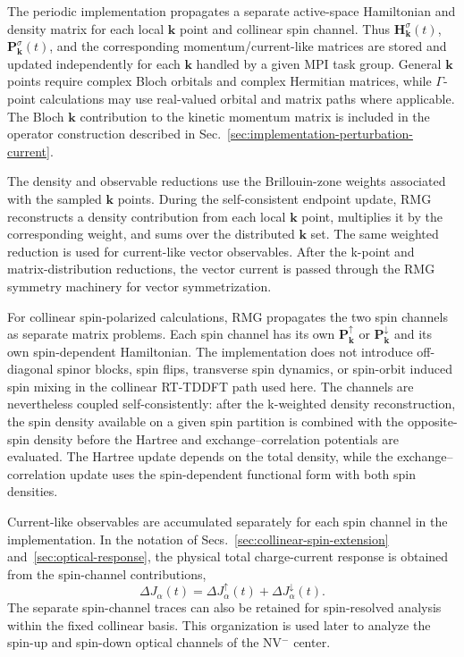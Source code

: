 The periodic implementation propagates a separate active-space
Hamiltonian and density matrix for each local $\mathbf k$ point and
collinear spin channel.  Thus
$\mathbf H_{\mathbf k}^{\sigma}(t)$,
$\mathbf P_{\mathbf k}^{\sigma}(t)$, and the corresponding
momentum/current-like matrices are stored and updated independently for
each $\mathbf k$ handled by a given MPI task group.  General
$\mathbf k$ points require complex Bloch orbitals and complex
Hermitian matrices, while $\Gamma$-point calculations may use
real-valued orbital and matrix paths where applicable.  The Bloch
$\mathbf k$ contribution to the kinetic momentum matrix is included in
the operator construction described in
Sec.~\ref{sec:implementation-perturbation-current}.

The density and observable reductions use the Brillouin-zone weights
associated with the sampled $\mathbf k$ points.  During the
self-consistent endpoint update, RMG reconstructs a density
contribution from each local $\mathbf k$ point, multiplies it by the
corresponding weight, and sums over the distributed $\mathbf k$ set.
The same weighted reduction is used for current-like vector
observables.  After the k-point and matrix-distribution reductions,
the vector current is passed through the RMG symmetry machinery for
vector symmetrization.

For collinear spin-polarized calculations, RMG propagates the two spin
channels as separate matrix problems.  Each spin channel has its own
$\mathbf P_{\mathbf k}^{\uparrow}$ or
$\mathbf P_{\mathbf k}^{\downarrow}$ and its own spin-dependent
Hamiltonian.  The implementation does not introduce off-diagonal
spinor blocks, spin flips, transverse spin dynamics, or spin-orbit
induced spin mixing in the collinear RT-TDDFT path used here.  The
channels are nevertheless coupled self-consistently: after the
k-weighted density reconstruction, the spin density available on a
given spin partition is combined with the opposite-spin density before
the Hartree and exchange--correlation potentials are evaluated.  The
Hartree update depends on the total density, while the
exchange--correlation update uses the spin-dependent functional form
with both spin densities.

Current-like observables are accumulated separately for each spin
channel in the implementation.  In the notation of
Secs.~\ref{sec:collinear-spin-extension} and~\ref{sec:optical-response},
the physical total charge-current response is obtained from the
spin-channel contributions,
\begin{equation}
  \Delta J_\alpha(t)
  =
  \Delta J_\alpha^\uparrow(t)
  +
  \Delta J_\alpha^\downarrow(t).
  \label{eq:impl_spin_sum_current}
\end{equation}
The separate spin-channel traces can also be retained for
spin-resolved analysis within the fixed collinear basis.  This
organization is used later to analyze the spin-up and spin-down
optical channels of the NV$^{-}$ center.

